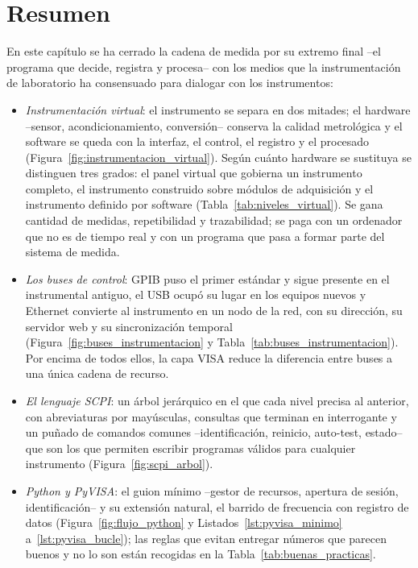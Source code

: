 \section{Resumen}\label{sec:resumen_instrumentacion_virtual}

En este capítulo se ha cerrado la cadena de medida por su extremo final --el programa que decide, registra y procesa-- con los medios que la instrumentación de laboratorio ha consensuado para dialogar con los instrumentos:

\begin{itemize}
    \item \emph{Instrumentación virtual}: el instrumento se separa en dos mitades; el hardware --sensor, acondicionamiento, conversión-- conserva la calidad metrológica y el software se queda con la interfaz, el control, el registro y el procesado (Figura~\ref{fig:instrumentacion_virtual}). Según cuánto hardware se sustituya se distinguen tres grados: el panel virtual que gobierna un instrumento completo, el instrumento construido sobre módulos de adquisición y el instrumento definido por software (Tabla~\ref{tab:niveles_virtual}). Se gana cantidad de medidas, repetibilidad y trazabilidad; se paga con un ordenador que no es de tiempo real y con un programa que pasa a formar parte del sistema de medida.
    \item \emph{Los buses de control}: GPIB puso el primer estándar y sigue presente en el instrumental antiguo, el USB ocupó su lugar en los equipos nuevos y Ethernet convierte al instrumento en un nodo de la red, con su dirección, su servidor web y su sincronización temporal (Figura~\ref{fig:buses_instrumentacion} y Tabla~\ref{tab:buses_instrumentacion}). Por encima de todos ellos, la capa VISA reduce la diferencia entre buses a una única cadena de recurso.
    \item \emph{El lenguaje SCPI}: un árbol jerárquico en el que cada nivel precisa al anterior, con abreviaturas por mayúsculas, consultas que terminan en interrogante y un puñado de comandos comunes --identificación, reinicio, auto-test, estado-- que son los que permiten escribir programas válidos para cualquier instrumento (Figura~\ref{fig:scpi_arbol}).
    \item \emph{Python y PyVISA}: el guion mínimo --gestor de recursos, apertura de sesión, identificación-- y su extensión natural, el barrido de frecuencia con registro de datos (Figura~\ref{fig:flujo_python} y Listados~\ref{lst:pyvisa_minimo} a~\ref{lst:pyvisa_bucle}); las reglas que evitan entregar números que parecen buenos y no lo son están recogidas en la Tabla~\ref{tab:buenas_practicas}.

\end{itemize}
